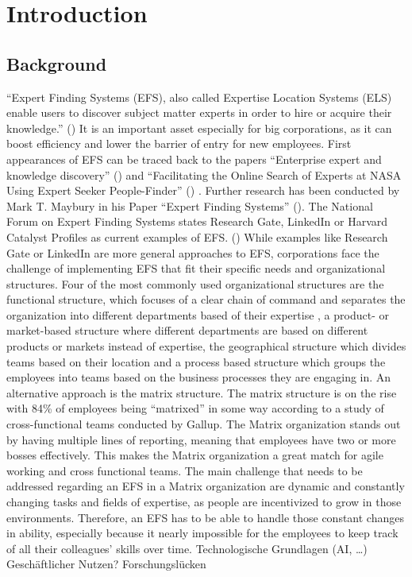 \newpage
\section{Introduction}

\subsection{Background}
“Expert Finding Systems (EFS), also called Expertise Location Systems (ELS) enable users to discover subject matter experts in order to hire or acquire their knowledge.” (\cite[page vii]{maybury_expert_nodate}) It is an important asset especially for big corporations, as it can boost efficiency and lower the barrier of entry for new employees. First appearances of EFS can be traced back to the papers “Enterprise expert and knowledge discovery” (\cite{mattox_enterprise_1999}) and “Facilitating the Online Search of Experts at NASA Using Expert Seeker People-Finder” (\cite{becerra-fernandez_facilitating_nodate}) . Further research has been conducted by Mark T. Maybury in his Paper “Expert Finding Systems” (\cite{maybury_expert_nodate}). The National Forum on Expert Finding Systems states Research Gate, LinkedIn or Harvard Catalyst Profiles as current examples of EFS. (\cite{noauthor_national_nodate})  While examples like Research Gate or LinkedIn are more general approaches to EFS, corporations face the challenge of implementing EFS that fit their specific needs and organizational structures.
Four of the most commonly used organizational structures are the functional structure, which focuses of a clear chain of command and separates the organization into different departments based of their expertise \cite{noauthor_what_nodate-1} , a product- or market-based structure where different departments are based on different products or markets instead of expertise, the geographical structure which divides teams based on their location and a process based structure which groups the employees into teams based on the business processes they are engaging in.   
An alternative approach is the matrix structure. The matrix structure is on the rise with 84\% of employees being “matrixed” in some way according to a study of cross-functional teams conducted by Gallup.   The Matrix organization stands out by having multiple lines of reporting, meaning that employees have two or more bosses effectively.     This makes the Matrix organization a great match for agile working and cross functional teams. The main challenge that needs to be addressed regarding an EFS in a Matrix organization are dynamic and constantly changing tasks and fields of expertise, as people are incentivized to grow in those environments.
Therefore, an EFS has to be able to handle those constant changes in ability, especially because it nearly impossible for the employees to keep track of all their colleagues’ skills over time. 
Technologische Grundlagen (AI, …)
Geschäftlicher Nutzen?
Forschungslücken


